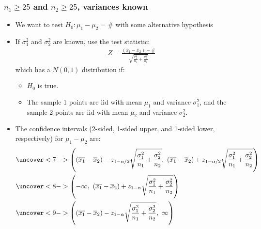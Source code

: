 \documentclass[handout]{beamer}\usepackage[]{graphicx}\usepackage[]{color}
\providecommand{\ov}[1]{\overline{#1}}
\numberwithin{equation}{section}
\begin{document}
\begin{frame}
\frametitle{$n_1 \ge 25$ and $n_2 \ge 25$, variances known} \scriptsize
\begin{itemize}
\item We want to test $H_0: \mu_1 - \mu_2 = \#$ with some alternative hypothesis
\pause \item If $\sigma^2_1$ and $\sigma_2^2$ are known, use the test statistic:
\pause \begin{align*}
Z = \frac{(\ov{x}_1 - \ov{x}_2) - \#}{\sqrt{\frac{\sigma^2_1}{n_1} + \frac{\sigma^2_2}{n_2}}}
\end{align*}
which has a $N(0,1)$ distribution if:
\begin{itemize}
\pause \item $H_0$ is true.
\pause \item The sample 1 points are iid with mean $\mu_1$ and variance $\sigma^2_1$, and the sample 2 points are iid with mean $\mu_2$ and variance $\sigma^2_2$.
\end{itemize}
\pause \item The confidence intervals (2-sided, 1-sided upper, and 1-sided lower, respectively) for $\mu_1 - \mu_2$ are:
\begin{align*}
&\uncover<7->{\left ((\ov{x_1} - \ov{x}_2) - z_{1 - \alpha/2} \sqrt{\frac{\sigma^2_1}{n_1} + \frac{\sigma^2_2}{n_2}} , \ (\ov{x_1} - \ov{x}_2) + z_{1 - \alpha/2} \sqrt{\frac{\sigma^2_1}{n_1} + \frac{\sigma^2_2}{n_2}} \right )} \\
&\uncover<8->{\left (-\infty , \ (\ov{x_1} - \ov{x}_2) + z_{1 - \alpha} \sqrt{\frac{\sigma^2_1}{n_1} + \frac{\sigma^2_2}{n_2}} \right )} \\
&\uncover<9->{\left ((\ov{x_1} - \ov{x}_2) - z_{1 - \alpha} \sqrt{\frac{\sigma^2_1}{n_1} + \frac{\sigma^2_2}{n_2}}, \ \infty \right )} 
\end{align*}
\end{itemize}
\end{frame}
\end{document}
